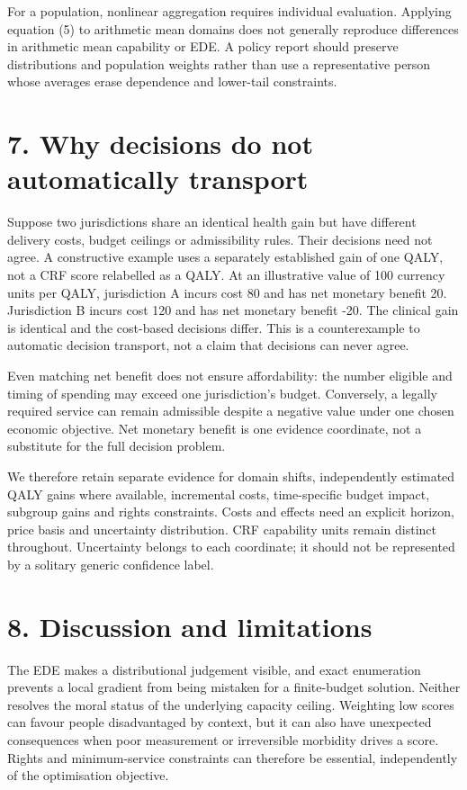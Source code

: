 \documentclass[11pt,a4paper]{article}
\begin{document}
For a population, nonlinear aggregation requires individual evaluation. Applying equation (5) to arithmetic mean domains does not generally reproduce differences in arithmetic mean capability or EDE. A policy report should preserve distributions and population weights rather than use a representative person whose averages erase dependence and lower-tail constraints.

\section*{7. Why decisions do not automatically transport}
Suppose two jurisdictions share an identical health gain but have different delivery costs, budget ceilings or admissibility rules. Their decisions need not agree. A constructive example uses a separately established gain of one QALY, not a CRF score relabelled as a QALY. At an illustrative value of 100 currency units per QALY, jurisdiction A incurs cost 80 and has net monetary benefit 20. Jurisdiction B incurs cost 120 and has net monetary benefit -20. The clinical gain is identical and the cost-based decisions differ. This is a counterexample to automatic decision transport, not a claim that decisions can never agree.

Even matching net benefit does not ensure affordability: the number eligible and timing of spending may exceed one jurisdiction's budget. Conversely, a legally required service can remain admissible despite a negative value under one chosen economic objective. Net monetary benefit is one evidence coordinate, not a substitute for the full decision problem.

We therefore retain separate evidence for domain shifts, independently estimated QALY gains where available, incremental costs, time-specific budget impact, subgroup gains and rights constraints. Costs and effects need an explicit horizon, price basis and uncertainty distribution. CRF capability units remain distinct throughout. Uncertainty belongs to each coordinate; it should not be represented by a solitary generic confidence label.

\section*{8. Discussion and limitations}
The EDE makes a distributional judgement visible, and exact enumeration prevents a local gradient from being mistaken for a finite-budget solution. Neither resolves the moral status of the underlying capacity ceiling. Weighting low scores can favour people disadvantaged by context, but it can also have unexpected consequences when poor measurement or irreversible morbidity drives a score. Rights and minimum-service constraints can therefore be essential, independently of the optimisation objective.
\end{document}
